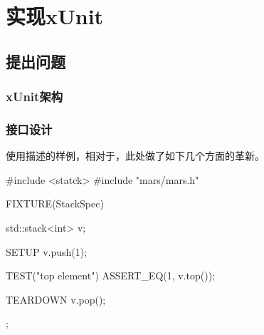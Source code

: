 \begin{savequote}[45mm]
\end{savequote}

\chapter{实现xUnit} 
\label{ch:ice-breaker}

\begin{content}

\end{content}

\section{提出问题}
	
\begin{content}

\subsection{xUnit架构}

\subsection{接口设计}

使用描述的样例，相对于，此处做了如下几个方面的革新。

\begin{enum}
\end{enum}


\begin{leftbar}
 \begin{c++}
#include <statck>
#include "mars/mars.h"

FIXTURE(StackSpec) {
  std::stack<int> v;   

  SETUP {
    v.push(1);
  }

  TEST("top element") {
    ASSERT_EQ(1, v.top());
  }
 
  TEARDOWN {
    v.pop();
  }
}; 
 \end{c++}
\end{leftbar}

\end{content}

